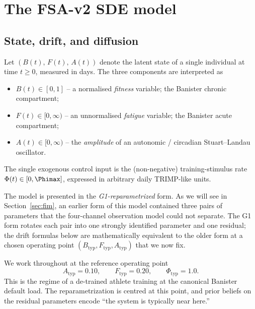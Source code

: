 \section{The FSA-v2 SDE model}\label{sec:fsa}

\subsection{State, drift, and diffusion}

Let $(B(t),\,F(t),\,A(t))$ denote the latent state of a single individual
at time $t \ge 0$, measured in days. The three components are interpreted as
\begin{itemize}
  \item $B(t) \in [0,1]$ -- a normalised \emph{fitness} variable; the
        Banister chronic compartment;
  \item $F(t) \in [0,\infty)$ -- an unnormalised \emph{fatigue} variable;
        the Banister acute compartment;
  \item $A(t) \in [0,\infty)$ -- the \emph{amplitude} of an autonomic /
        circadian Stuart--Landau oscillator.
\end{itemize}
The single exogenous control input is the (non-negative) training-stimulus
rate $\Phi(t) \in [0,\Phimax]$, expressed in arbitrary daily TRIMP-like
units.

The model is presented in the \emph{G1-reparametrized} form. As we will
see in Section~\ref{sec:fim}, an earlier form of this model contained
three pairs of parameters that the four-channel observation model could
not separate. The G1 form rotates each pair into one strongly identified
parameter and one residual; the drift formulas below are
mathematically equivalent to the older form at a chosen operating point
$(B_{\mathrm{typ}},F_{\mathrm{typ}},A_{\mathrm{typ}})$ that we now fix.

\begin{definition}\label{def:operating-point}
We work throughout at the reference operating point
\begin{equation}
  A_{\mathrm{typ}} = 0.10, \qquad
  F_{\mathrm{typ}} = 0.20, \qquad
  \Phi_{\mathrm{typ}} = 1.0.
  \label{eq:operating-point}
\end{equation}
This is the regime of a de-trained athlete training at the canonical
Banister default load. The reparametrization is centred at this point,
and prior beliefs on the residual parameters encode ``the system is
typically near here.''
\end{definition}

